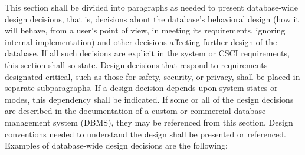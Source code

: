This section shall be divided into paragraphs as needed to present
database-wide design decisions, that is, decisions about the database's
behavioral design (how it will behave, from a user's point of view, in
meeting its requirements, ignoring internal implementation) and other
decisions affecting further design of the database. If all such
decisions are explicit in the system or CSCI requirements, this section
shall so state. Design decisions that respond to requirements designated
critical, such as those for safety, security, or privacy, shall be
placed in separate subparagraphs. If a design decision depends upon
system states or modes, this dependency shall be indicated. If some or
all of the design decisions are described in the documentation of a
custom or commercial database management system (DBMS), they may be
referenced from this section. Design conventions needed to understand
the design shall be presented or referenced. Examples of database-wide
design decisions are the following:

